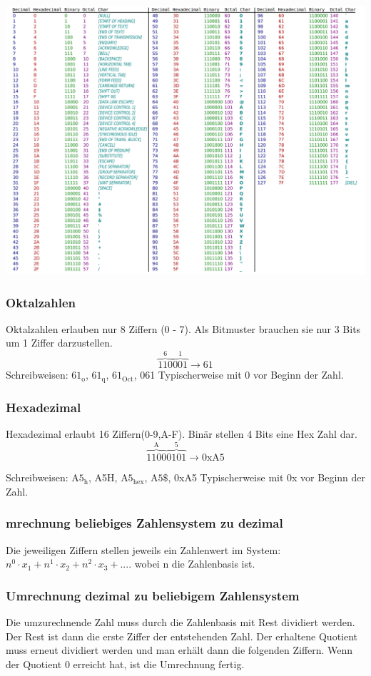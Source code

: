 \includegraphics[width=1\columnwidth]{Pictures/ASCII_Table.png}

\subsubsection{Oktalzahlen}

Oktalzahlen erlauben nur 8 Ziffern (0 - 7). Als Bitmuster brauchen sie nur 3 Bits um 1 Ziffer darzustellen.
\[
\overbrace{110}^\text{6} 
\overbrace{001}^\text{1} 
\rightarrow 61
\]
Schreibweisen: $61_{\text{o}}$, $61_{\text{q}}$, $61_{\text{Oct}}$, 061\newline
Typischerweise mit 0 vor Beginn der Zahl.

\subsubsection{Hexadezimal}

Hexadezimal erlaubt 16 Ziffern(0-9,A-F). Binär stellen 4 Bits eine Hex Zahl dar.
\[
\overbrace{1100}^\text{A} 
\overbrace{0101}^\text{5} 
\rightarrow \text{0xA5}
\]

Schreibweisen: $\text{A5}_{\text{h}}$, A5H, $\text{A5}_{\text{hex}}$, $\text{A5}\$$, 0xA5\newline
Typischerweise mit 0x vor Beginn der Zahl.

\subsubsection{mrechnung beliebiges Zahlensystem zu dezimal}

Die jeweiligen Ziffern stellen jeweils ein Zahlenwert im System:\newline $n^0 \cdot x_1 + n^1 \cdot x_2 + n^2 \cdot x_3 + ....$ wobei n die Zahlenbasis ist.

\subsubsection{Umrechnung dezimal zu beliebigem Zahlensystem}

Die umzurechnende Zahl muss durch die Zahlenbasis mit Rest dividiert werden. Der Rest ist dann die erste Ziffer der entstehenden Zahl. Der erhaltene Quotient muss erneut dividiert werden und man erhält dann die folgenden Ziffern. Wenn der Quotient 0 erreicht hat, ist die Umrechnung fertig. 
